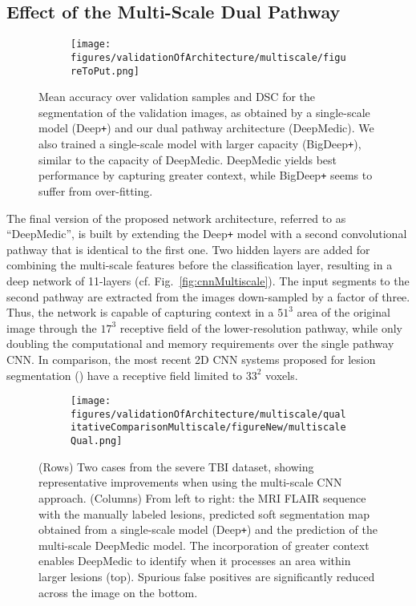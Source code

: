 \documentclass[preprint,authoryear,12pt]{elsarticle}
\newcommand{\quot}[1]{``#1''}
\begin{document}
\subsection{Effect of the Multi-Scale Dual Pathway}
\label{subsec:valMultiscale}

\begin{figure}[!h]
\centering
\begin{subfigure}[b]{0.5\textwidth}
\centering
\texttt{[image: figures/validationOfArchitecture/multiscale/figureToPut.png]}
\end{subfigure}
\caption{Mean accuracy over validation samples and DSC for the segmentation of the validation images, as obtained by a single-scale model (Deep\texttt{+}) and our dual pathway architecture (DeepMedic). We also trained a single-scale model with larger capacity (BigDeep\texttt{+}), similar to the capacity of DeepMedic. DeepMedic yields best performance by capturing greater context, while BigDeep\texttt{+} seems to suffer from over-fitting.
}
\label{fig:multiscaleExperiment}
\end{figure}
%
 
The final version of the proposed network architecture, referred to as \quot{DeepMedic}, is built by extending the Deep\texttt{+} model with a second convolutional pathway that is identical to the first one. Two hidden layers are added for combining the multi-scale features before the classification layer, resulting in a deep network of 11-layers (cf. Fig.~\ref{fig:cnnMultiscale}). The input segments to the second pathway are extracted from the images down-sampled by a factor of three. Thus, the network is capable of capturing context in a $51^3$ area of the original image through the $17^3$ receptive field of the lower-resolution pathway, while only doubling the computational and memory requirements over the single pathway CNN. In comparison, the most recent 2D CNN systems proposed for lesion segmentation (\cite{Havei2015Journal, pereira2015Brats}) have a receptive field limited to $33^2$ voxels.

\begin{figure}[!h]
\centering
\begin{subfigure}[b]{0.85\textwidth}
\centering
	\texttt{[image: figures/validationOfArchitecture/multiscale/qualitativeComparisonMultiscale/figureNew/multiscaleQual.png]}
\end{subfigure}

\caption{(Rows) Two cases from the severe TBI dataset, showing representative improvements when using the multi-scale CNN approach. (Columns) From left to right: the MRI FLAIR sequence with the manually labeled lesions, predicted soft segmentation map obtained from a single-scale model (Deep\texttt{+}) and the prediction of the multi-scale DeepMedic model. The incorporation of greater context enables DeepMedic to identify when it processes an area within larger lesions (top). Spurious false positives are significantly reduced across the image on the bottom.}
\label{fig:qualitativeMultiscaleVal}
\end{figure}
%
 
\end{document}

